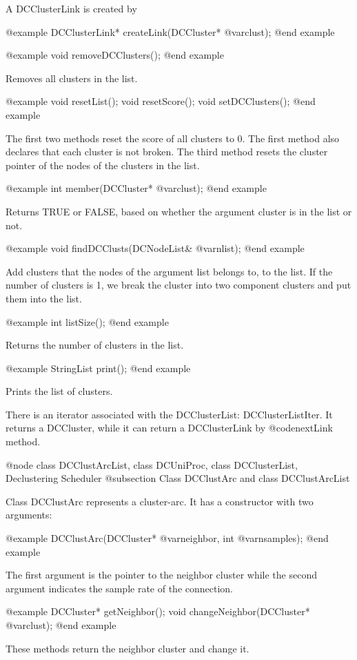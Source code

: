 A DCClusterLink is created by

@example
DCClusterLink* createLink(DCCluster* @var{clust});
@end example

@example
void removeDCClusters();
@end example

Removes all clusters in the list.

@example
void resetList();
void resetScore();
void setDCClusters();
@end example

The first two methods reset the score of all clusters to 0. The first method
also declares that each cluster is not broken. The third method resets the
cluster pointer of the nodes of the clusters in the list.

@example
int member(DCCluster* @var{clust});
@end example

Returns TRUE or FALSE, based on whether the argument cluster is in the list or
not.

@example
void findDCClusts(DCNodeList& @var{nlist});
@end example

Add clusters that the nodes of the argument list belongs to, to the list.
If the number of clusters is 1, we break the cluster into two
component clusters and put them into the list.

@example
int listSize();
@end example

Returns the number of clusters in the list.

@example
StringList print();
@end example

Prints the list of clusters.

There is an iterator associated with the DCClusterList: DCClusterListIter.
It returns a DCCluster, while it can return a DCClusterLink by
@code{nextLink} method.

@node class DCClustArcList, class DCUniProc, class DCClusterList, Declustering Scheduler
@subsection Class DCClustArc and class DCClustArcList

Class DCClustArc represents a cluster-arc. It has a constructor with two
arguments:

@example
DCClustArc(DCCluster* @var{neighbor}, int @var{nsamples});
@end example

The first argument is the pointer to the neighbor cluster while the second
argument indicates the sample rate of the connection.

@example
DCCluster* getNeighbor();
void changeNeighbor(DCCluster* @var{clust});
@end example

These methods return the neighbor cluster and change it.

